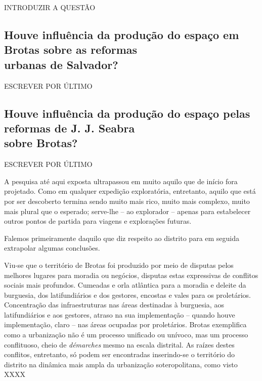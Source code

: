 INTRODUZIR A QUESTÃO

\subsection[Houve influência da produção do espaço em Brotas sobre as reformas\\ urbanas de Salvador?]{Houve influência da produção do espaço em Brotas sobre as reformas\\ urbanas de Salvador?}\label{subsec:3.3.1}

ESCREVER POR ÚLTIMO

\subsection[Houve influência da produção do espaço pelas reformas de J. J. Seabra\\sobre Brotas?]{Houve influência da produção do espaço pelas reformas de J. J. Seabra\\ sobre Brotas?}\label{subsec:3.3.2}

ESCREVER POR ÚLTIMO


A pesquisa até aqui exposta ultrapassou em muito aquilo que de início fora projetado. Como em qualquer expedição exploratória, entretanto, aquilo que está por ser descoberto termina sendo muito mais rico, muito mais complexo, muito mais plural que o esperado; serve-lhe -- ao explorador -- apenas para estabelecer outros pontos de partida para viagens e explorações futuras.

Falemos primeiramente daquilo que diz respeito ao distrito para em seguida extrapolar algumas conclusões.

Viu-se que o território de Brotas foi produzido por meio de disputas pelos melhores lugares para moradia ou negócios, disputas estas expressivas de conflitos sociais mais profundos. Cumeadas e orla atlântica para a moradia e deleite da burguesia, dos latifundiários e dos gestores, encostas e vales para os proletários. Concentração das infraestruturas nas áreas destinadas à burguesia, aos latifundiários e aos gestores, atraso na sua implementação -- quando houve implementação, claro -- nas áreas ocupadas por proletários. Brotas exemplifica como a urbanização não é um processo unificado ou unívoco, mas um processo conflituoso, cheio de \textit{démarches} mesmo na escala distrital. As raízes destes conflitos, entretanto, só podem ser encontradas inserindo-se o território do distrito na dinâmica mais ampla da urbanização soteropolitana, como visto XXXX

